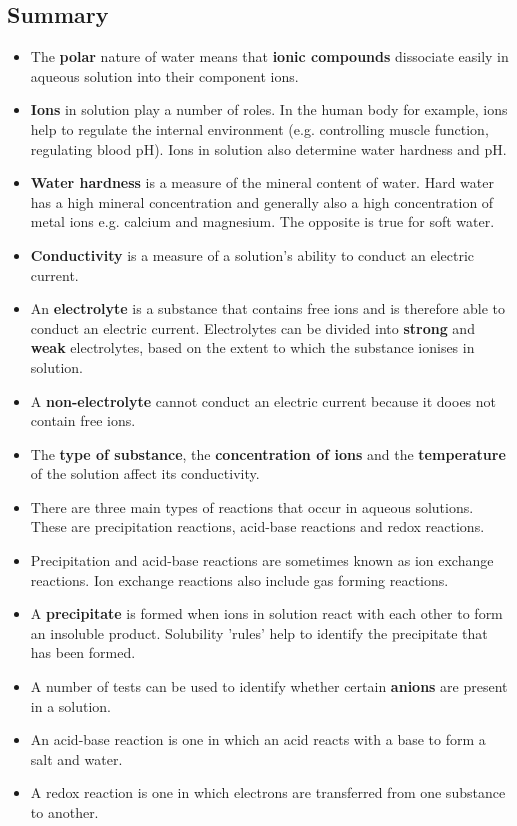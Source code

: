             \subsection{ Summary}
            \nopagebreak
            \label{m38719*eip-903}\begin{itemize}[noitemsep]
            \label{m38719*uid95}\item The \textbf{polar} nature of water means that \textbf{ionic compounds} dissociate easily in aqueous solution into their component ions.
\label{m38719*uid96}\item \textbf{Ions} in solution play a number of roles. In the human body for example, ions help to regulate the internal environment (e.g. controlling muscle function, regulating blood pH). Ions in solution also determine water hardness and pH.
\label{m38719*uid97}\item \textbf{Water hardness} is a measure of the mineral content of water. Hard water has a high mineral concentration and generally also a high concentration of metal ions e.g. calcium and magnesium. The opposite is true for soft water.
\label{m38719*uid100}\item \textbf{Conductivity} is a measure of a solution's ability to conduct an electric current.
\label{m38719*uid101}\item An \textbf{electrolyte} is a substance that contains free ions and is therefore able to conduct an electric current. Electrolytes can be divided into \textbf{strong} and \textbf{weak} electrolytes, based on the extent to which the substance ionises in solution.
\label{m38719*uid102}\item A \textbf{non-electrolyte} cannot conduct an electric current because it dooes not contain free ions.
\label{m38719*uid103}\item The \textbf{type of substance}, the \textbf{concentration of ions} and the \textbf{temperature} of the solution affect its conductivity.
\label{m38719*uid0253}\item There are three main types of reactions that occur in aqueous solutions. These are precipitation reactions, acid-base reactions and redox reactions.
\label{m38719*uid8923}\item 
Precipitation and acid-base reactions are sometimes known as ion exchange reactions. Ion exchange reactions also include gas forming reactions.
\label{m38719*uid104}\item A \textbf{precipitate} is formed when ions in solution react with each other to form an insoluble product. Solubility 'rules' help to identify the precipitate that has been formed.
\label{m38719*uid105}\item A number of tests can be used to identify whether certain \textbf{anions} are present in a solution.
\label{m38719*id813}\item An acid-base reaction is one in which an acid reacts with a base to form a salt and water.
\label{m38719*uid823}\item A redox reaction is one in which electrons are transferred from one substance to another. 
\end{itemize}
